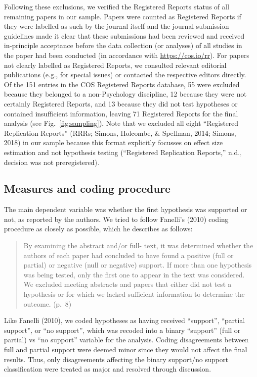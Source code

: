 \documentclass[british,,jou,floatsintext]{apa6}
\begin{document}
Following these exclusions, we verified the Registered Reports status of all remaining papers in our sample.
Papers were counted as Registered Reports if they were labelled as such by the journal itself and the journal submission guidelines made it clear that these submissions had been reviewed and received in-principle acceptance before the data collection (or analyses) of all studies in the paper had been conducted (in accordance with \url{https://cos.io/rr}).
For papers not clearly labelled as Registered Reports, we consulted relevant editorial publications (e.g., for special issues) or contacted the respective editors directly.
Of the 151 entries in the COS Registered Reports database, 55 were excluded because they belonged to a non-Psychology discipline, 12 because they were not certainly Registered Reports, and 13 because they did not test hypotheses or contained insufficient information, leaving 71 Registered Reports for the final analysis (see Fig.~\ref{fig:sampling}).
Note that we excluded all eight \enquote{Registered Replication Reports} (RRRs; Simons, Holcombe, \& Spellman, 2014; Simons, 2018) in our sample because this format explicitly focusses on effect size estimation and not hypothesis testing (``Registered Replication Reports,'' n.d., decision was not preregistered).

\hypertarget{measures-and-coding-procedure}{%
\subsection{Measures and coding procedure}\label{measures-and-coding-procedure}}

The main dependent variable was whether the first hypothesis was supported or not, as reported by the authors.
We tried to follow Fanelli's (2010) coding procedure as closely as possible, which he describes as follows:

\begin{quote}
By examining the abstract and/or full- text, it was determined whether the authors of each paper had concluded to have found a positive (full or partial) or negative (null or negative) support.
If more than one hypothesis was being tested, only the first one to appear in the text was considered.
We excluded meeting abstracts and papers that either did not test a hypothesis or for which we lacked sufficient information to determine the outcome. (p.~8)
\end{quote}

Like Fanelli (2010), we coded hypotheses as having received \enquote{support}, \enquote{partial support}, or \enquote{no support}, which was recoded into a binary \enquote{support} (full or partial) vs \enquote{no support} variable for the analysis.
Coding disagreements between full and partial support were deemed minor since they would not affect the final results. Thus, only disagreements affecting the binary support/no support classification were treated as major and resolved through discussion.
\end{document}
